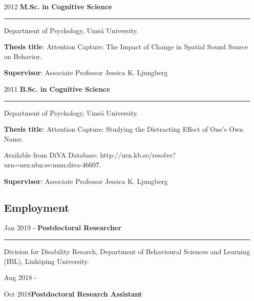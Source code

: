 \documentclass[]{article}
\begin{document}
2012 \hspace{1.5cm}\textbf{M.Sc. in Cognitive Science}\vspace{1mm}

\hrule
\begin{changemargin}{2.3cm}{2.4cm}

Department of Psychology, Umeå University.

\textbf{Thesis title}: Attention Capture: The Impact of Change in Spatial Sound Source on Behavior. 
    
\textbf{Supervisor}: Associate Professor Jessica K. Ljungberg
\end{changemargin}

2011 \hspace{1.5cm}\textbf{B.Sc. in Cognitive Science}\vspace{1mm}

\hrule

\begin{changemargin}{2.3cm}{2.4cm}

Department of Psychology, Umeå University.

\textbf{Thesis title}:  Attention Capture: Studying the Distracting Effect of One’s Own Name.

Available from DiVA Database: \sloppy http://urn.kb.se/resolve?urn=urn:nbn:se:umu:diva-46607.
    
\textbf{Supervisor}: Associate Professor Jessica K. Ljungberg
\end{changemargin}

\hypertarget{employment}{%
\subsection{Employment}\label{employment}}

Jan 2019 - \hspace{0.50cm}\textbf{Postdoctoral Researcher}\vspace{1mm}

\hrule
\begin{changemargin}{2.3cm}{2.4cm}

Division for Disability Resarch, Department of Behavioural Sciences and Learning (IBL), Linköping University.

\end{changemargin}

Aug 2018 -

Oct
2018\hspace{0.75cm}\textbf{Postdoctoral Research Assistant}\vspace{1mm}
\end{document}
